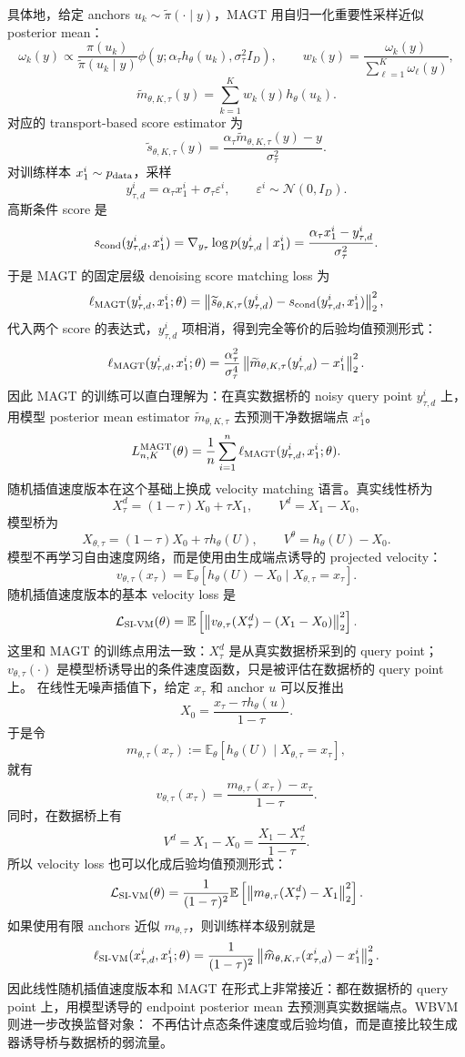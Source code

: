 \documentclass[UTF8,11pt]{ctexart}
\newcommand{\E}{\mathbb{E}}
\begin{document}
具体地，给定 anchors \(u_k\sim\tilde\pi(\cdot\mid y)\)，MAGT 用自归一化重要性采样近似 posterior mean：
\[
\omega_k(y)
\propto
\frac{\pi(u_k)}{\tilde\pi(u_k\mid y)}
\phi\left(
y;\alpha_\tau h_\theta(u_k),\sigma_\tau^2 I_D
\right),
\qquad
w_k(y)=
\frac{\omega_k(y)}{\sum_{\ell=1}^K\omega_\ell(y)},
\]
\[
\widetilde m_{\theta,K,\tau}(y)
=
\sum_{k=1}^K w_k(y)h_\theta(u_k).
\]
对应的 transport-based score estimator 为
\[
\widetilde s_{\theta,K,\tau}(y)
=
\frac{
\alpha_\tau \widetilde m_{\theta,K,\tau}(y)-y
}{\sigma_\tau^2}.
\]
对训练样本 \(x_1^i\sim p_{\rm data}\)，采样
\[
y_{\tau,d}^i=\alpha_\tau x_1^i+\sigma_\tau\varepsilon^i,
\qquad
\varepsilon^i\sim\mathcal N(0,I_D).
\]
高斯条件 score 是
\[
s_{\rm cond}(y_{\tau,d}^i,x_1^i)
=
\nabla_{y_\tau}\log p(y_{\tau,d}^i\mid x_1^i)
=
\frac{\alpha_\tau x_1^i-y_{\tau,d}^i}{\sigma_\tau^2}.
\]
于是 MAGT 的固定层级 denoising score matching loss 为
\[
\ell_{\rm MAGT}(y_{\tau,d}^i,x_1^i;\theta)
=
\left\|
\widetilde s_{\theta,K,\tau}(y_{\tau,d}^i)
-
s_{\rm cond}(y_{\tau,d}^i,x_1^i)
\right\|_2^2,
\]
代入两个 score 的表达式，\(y_{\tau,d}^i\) 项相消，得到完全等价的后验均值预测形式：
\[
\ell_{\rm MAGT}(y_{\tau,d}^i,x_1^i;\theta)
=
\frac{\alpha_\tau^2}{\sigma_\tau^4}
\left\|
\widetilde m_{\theta,K,\tau}(y_{\tau,d}^i)-x_1^i
\right\|_2^2.
\]
因此 MAGT 的训练可以直白理解为：在真实数据桥的 noisy query point
\(y_{\tau,d}^i\) 上，用模型 posterior mean estimator
\(\widetilde m_{\theta,K,\tau}\) 去预测干净数据端点 \(x_1^i\)。
\[
L_{n,K}^{\rm MAGT}(\theta)
=
\frac1n
\sum_{i=1}^n
\ell_{\rm MAGT}(y_{\tau,d}^i,x_1^i;\theta).
\]
随机插值速度版本在这个基础上换成 velocity matching 语言。真实线性桥为
\[
X_\tau^d=(1-\tau)X_0+\tau X_1,
\qquad
V^d=X_1-X_0,
\]
模型桥为
\[
X_{\theta,\tau}=(1-\tau)X_0+\tau h_\theta(U),
\qquad
V^\theta=h_\theta(U)-X_0.
\]
模型不再学习自由速度网络，而是使用由生成端点诱导的 projected velocity：
\[
v_{\theta,\tau}(x_\tau)
=
\E_\theta[h_\theta(U)-X_0\mid X_{\theta,\tau}=x_\tau].
\]
随机插值速度版本的基本 velocity loss 是
\[
\mathcal L_{\rm SI\text{-}VM}(\theta)
=
\E\left[
\left\|
v_{\theta,\tau}(X_\tau^d)
-
(X_1-X_0)
\right\|_2^2
\right].
\]
这里和 MAGT 的训练点用法一致：\(X_\tau^d\) 是从真实数据桥采到的 query point；
\(v_{\theta,\tau}(\cdot)\) 是模型桥诱导出的条件速度函数，只是被评估在数据桥的 query point 上。
在线性无噪声插值下，给定 \(x_\tau\) 和 anchor \(u\) 可以反推出
\[
X_0
=
\frac{x_\tau-\tau h_\theta(u)}{1-\tau}.
\]
于是令
\[
m_{\theta,\tau}(x_\tau)
:=
\E_\theta[h_\theta(U)\mid X_{\theta,\tau}=x_\tau],
\]
就有
\[
v_{\theta,\tau}(x_\tau)
=
\frac{
m_{\theta,\tau}(x_\tau)-x_\tau
}{1-\tau}.
\]
同时，在数据桥上有
\[
V^d=X_1-X_0=\frac{X_1-X_\tau^d}{1-\tau}.
\]
所以 velocity loss 也可以化成后验均值预测形式：
\[
\mathcal L_{\rm SI\text{-}VM}(\theta)
=
\frac{1}{(1-\tau)^2}
\E\left[
\left\|
m_{\theta,\tau}(X_\tau^d)-X_1
\right\|_2^2
\right].
\]
如果使用有限 anchors 近似 \(m_{\theta,\tau}\)，则训练样本级别就是
\[
\ell_{\rm SI\text{-}VM}(x_{\tau,d}^i,x_1^i;\theta)
=
\frac{1}{(1-\tau)^2}
\left\|
\widehat m_{\theta,K,\tau}(x_{\tau,d}^i)-x_1^i
\right\|_2^2.
\]
因此线性随机插值速度版本和 MAGT 在形式上非常接近：都在数据桥的 query point 上，用模型诱导的 endpoint posterior mean 去预测真实数据端点。WBVM 则进一步改换监督对象：
不再估计点态条件速度或后验均值，而是直接比较生成器诱导桥与数据桥的弱流量。
\end{document}
